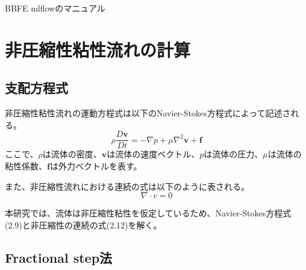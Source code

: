 \documentclass[8pt,a4paper]{article}
\newcommand{\bm}{\boldsymbol}
\begin{document}
 

\begin{center}
	{\Large BBFE mlflowのマニュアル} \\
\end{center}

\tableofcontents

\section{非圧縮性粘性流れの計算}
\subsection{支配方程式}
非圧縮性粘性流れの運動方程式は以下のNavier-Stokes方程式によって記述される。
\begin{equation}
\rho \frac{D\bm{v}}{Dt} = - \nabla p + \mu \nabla^{2} \bm{v} + \bm{f}
\end{equation}
ここで、$\rho$は流体の密度、$\bm{v}$は流体の速度ベクトル、$p$は流体の圧力、$\mu$は流体の粘性係数、$\bm{f}$は外力ベクトルを表す。

また、非圧縮性流れにおける連続の式は以下のように表される。
\begin{equation}
\nabla \cdot v = 0
\end{equation}

本研究では、流体は非圧縮性粘性を仮定しているため、Navier-Stokes方程式(2.9)と非圧縮性の連続の式(2.12)を解く。

\subsection{Fractional step法}
\end{document}
